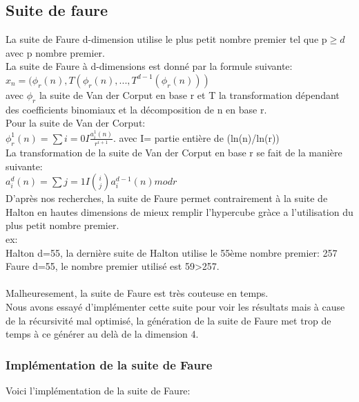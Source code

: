 \documentclass[12pt]{report}
\begin{document}
\clearpage
\subsection{Suite de faure}
  La suite de Faure  d-dimension utilise le plus petit nombre premier tel que p$\geq d$ avec p nombre premier.\\
La suite de Faure à d-dimensions est donné par la formule suivante:\\
$x_n=(\phi_r(n),T(\phi_r(n),...,T^{d-1}(\phi_r(n)))$\\
avec $\phi_r$ la suite de Van der Corput en base r et T la transformation dépendant des coefficients binomiaux et la décomposition de n en base r.\\
Pour la suite de Van der Corput:\\
$\phi_r^1(n)=\sum{i=0}{I}\frac{a_i^1(n)}{r^{i+1}}.$ avec I= partie entière de (ln(n)/ln(r))\\
La transformation de la suite de Van der Corput en base r se fait de la manière suivante:\\
$a_i^d(n)=\sum{j=1}{I}{i \choose j}a_i^{d-1}(n) mod r$\\

D'après nos recherches, la suite de Faure permet contrairement à la suite de Halton en hautes dimensions de mieux remplir l'hypercube gràce a l'utilisation du plus petit nombre premier.\\
ex:\\
Halton d=55, la dernière suite de Halton utilise le 55ème nombre premier: 257\\
Faure d=55, le nombre premier utilisé est 59>257.\\\\
Malheuresement, la suite de Faure est très couteuse en temps.\\
Nous avons essayé d'implémenter cette suite pour voir les résultats mais à cause de la récursivité mal optimisé, la génération de la suite de Faure met trop de temps à ce générer au delà de la dimension 4.\\

\newpage
\subsubsection{Implémentation de la suite de Faure}
Voici l'implémentation de la suite de Faure:\\
\end{document}
